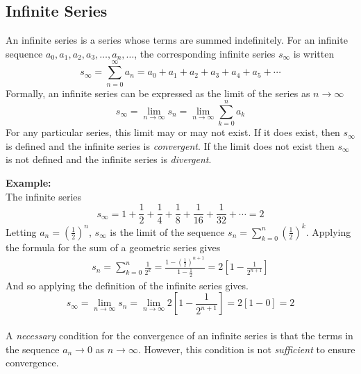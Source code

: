 \documentclass[11pt,a4paper,titlepage,oneside,openany]{article}
\begin{document}
\pagebreak
\subsection*{Infinite Series}
An infinite series is a series whose terms are summed indefinitely. For an infinite sequence $a_0,a_1,a_2,a_3,\ldots,a_n,\ldots$, the corresponding infinite series $s_\infty$ is written
\begin{equation*}
  s_\infty=\sum_{n=0}^{\infty}a_n=a_0+a_1+a_2+a_3+a_4+a_5+\cdots
\end{equation*}
Formally, an infinite series can be expressed as the limit of the series as $n\to \infty$
\begin{equation*}
  s_\infty = \lim_{n \to \infty} s_n = \lim_{n \to \infty} \sum_{k=0}^n a_k 
\end{equation*}
For any particular series, this limit may or may not exist. If it does exist, then $s_\infty$ is defined and the infinite series is \emph{convergent}. If the limit does not exist then $s_\infty$ is not defined and the infinite series is \emph{divergent}.

\noindent  \textbf{Example:}\\
The infinite series
\begin{equation*}
  s_\infty = 1+\frac{1}{2}+\frac{1}{4}+\frac{1}{8}+\frac{1}{16}+\frac{1}{32}+\cdots = 2
\end{equation*}
Letting $a_n=\left(\frac{1}{2}\right)^n$, $s_\infty$ is the limit of the sequence $s_n=\sum_{k=0}^{n} \left(\frac{1}{2}\right)^k$. Applying the formula for the sum of a geometric series gives 
\begin{align*}
  s_n = \sum_{k=0}^{n} \frac{1}{2^k} = \frac{1- \left( \frac{1}{2} \right)^{n+1} }{1-\frac{1}{2}} = 2 \left[ 1-\frac{1}{2^{n+1}} \right]
\end{align*}
And so applying the definition of the infinite series gives.
\begin{equation*}
  s_\infty=\lim_{n \to \infty} s_n = \lim_{n \to \infty} 2 \left[ 1- \frac{1}{2^{n+1}} \right]= 2 \left[ 1-0 \right] = 2
\end{equation*}\\
A \emph{necessary} condition for the convergence of an infinite series is that the terms in the sequence $a_n \to 0$ as $n \to \infty$. However, this condition is not \emph{sufficient} to ensure convergence.
\end{document}
